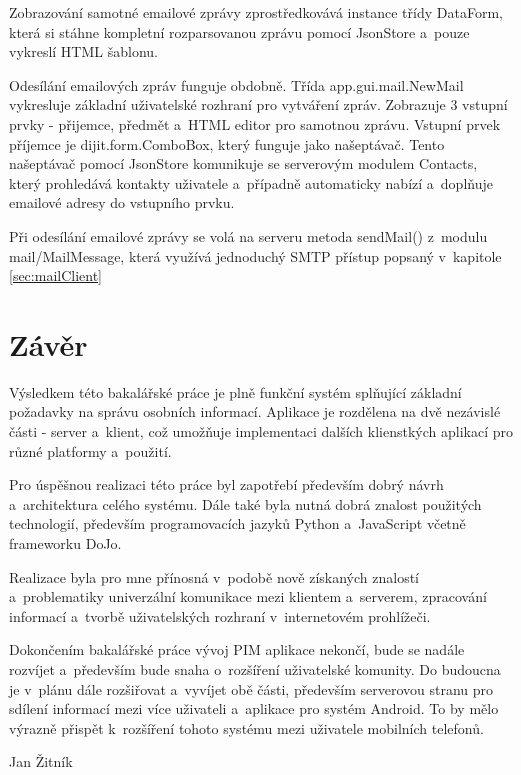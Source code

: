 \documentclass[bc,male,html,dept460]{diploma}				%
\begin{document}
Zobrazování samotné emailové zprávy zprostředkovává instance třídy DataForm, která si stáhne kompletní rozparsovanou zprávu pomocí JsonStore a~pouze vykreslí HTML šablonu.

Odesílání emailových zpráv funguje obdobně. Třída app.gui.mail.NewMail vykresluje základní uživatelské rozhraní pro vytváření zpráv.
Zobrazuje 3 vstupní prvky - přijemce, předmět a~HTML editor pro samotnou zprávu. Vstupní prvek příjemce je dijit.form.ComboBox, který funguje jako našeptávač. Tento našeptávač pomocí JsonStore komunikuje se serverovým modulem Contacts, který prohledává kontakty uživatele a~případně automaticky nabízí a~doplňuje emailové adresy do vstupního prvku.

Při odesílání emailové zprávy se volá na serveru metoda sendMail() z~modulu mail/MailMessage, která využívá jednoduchý SMTP přístup popsaný v~kapitole \ref{sec:mailClient}

\section{Závěr}
\label{sec:Conclusion}
Výsledkem této bakalářské práce je plně funkční systém splňující základní požadavky na správu osobních informací.
Aplikace je rozdělena na dvě nezávislé části - server a~klient, což umožňuje implementaci dalších klienstkých aplikací pro různé platformy a~použití.

Pro úspěšnou realizaci této práce byl zapotřebí především dobrý návrh a~architektura celého systému. Dále také byla nutná dobrá znalost použitých technologií, především programovacích jazyků Python a~JavaScript včetně frameworku DoJo.

Realizace byla pro mne přínosná v~podobě nově získaných znalostí a~problematiky univerzální komunikace mezi klientem a~serverem, zpracování informací a~tvorbě uživatel\-ských rozhraní v~internetovém prohlížeči.

Dokončením bakalářské práce vývoj PIM aplikace nekončí, bude se nadále rozvíjet a~především bude snaha o~rozšíření uživatelské komunity. Do budoucna je v~plánu dále rozšiřovat a~vyvíjet obě části, především serverovou stranu pro sdílení informací mezi více uživateli a~aplikace pro systém Android. To by mělo výrazně přispět k~rozšíření tohoto systému mezi uživatele mobilních telefonů.



\bigskip
\begin{flushright}
Jan Žitník
\end{flushright}
\end{document}
